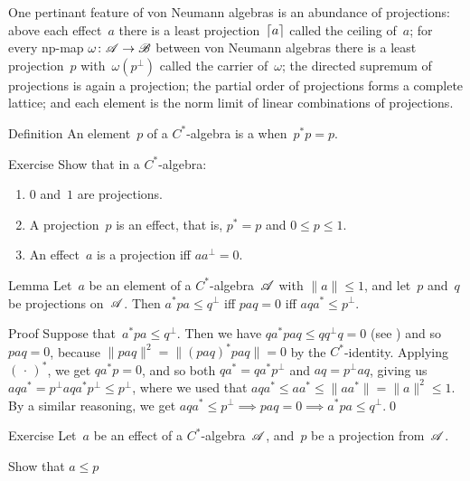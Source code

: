 \documentclass[a]{subfiles}
\begin{document}
\begin{parsec}%
\begin{point}%
One pertinant feature
of von Neumann algebras
is an abundance of projections:
above each effect~$a$ 
there is a least projection~$\left\lceil a\right\rceil$
called the ceiling of~$a$;
for every np-map $\omega\colon \mathscr{A}\to \mathscr{B}$
between von Neumann algebras
there is a least projection~$p$ with~$\omega(p^\perp)$
called the carrier of~$\omega$;
the directed supremum of projections is again a projection;
the partial order of projections forms a complete lattice;
and each element is the norm limit
of linear combinations of projections.
\end{point}
\begin{point}{Definition}%
An element~$p$ of a $C^*$-algebra
is a 
when~$p^*p=p$.
\end{point}
\begin{point}{Exercise}%
Show that in a $C^*$-algebra:
\begin{enumerate}
\item
$0$ and~$1$ are projections.
\item
A projection~$p$ is an effect,
that is, $p^*=p$
and $0\leq p\leq 1$.
\item
An effect~$a$ is a projection iff $aa^\perp=0$.
\end{enumerate}
\end{point}
\begin{point}[ad-contraposed]{Lemma}%
Let~$a$ be an element of a $C^*$-algebra~$\mathscr{A}$
with $\|a\|\leq 1$,
and let~$p$ and~$q$ be projections on~$\mathscr{A}$.
Then 
$a^* p a \leq q^\perp$
iff $paq=0$
iff  $aqa^*\leq p^\perp$.
\begin{point}{Proof}%
Suppose that~$a^*pa\leq q^\perp$.
Then we have $q a^*pa q \leq qq^\perp q = 0$
(see )
and so $paq=0$,
because $\|paq\|^2=\|(paq)^*paq\|=0$
by the $C^*$-identity.
Applying $(\,\cdot\,)^*$,
we get $qa^*p=0$, and so both $qa^* = qa^*p^\perp$
and $aq = p^\perp aq$, giving
us $aqa^* = p^\perp a q a^* p^\perp 
\leq p^\perp$,
where we used that $aqa^*\leq aa^*\leq \|aa^*\|=\|a\|^2\leq 1$.
By a similar reasoning,
we get $aqa^*\leq p^\perp \implies paq=0\implies a^*pa\leq q^\perp$.\qed
\end{point}
\end{point}
\begin{point}{Exercise}%
Let~$a$ be an effect of a $C^*$-algebra~$\mathscr{A}$,
and~$p$ be a projection from~$\mathscr{A}$.
\begin{point}%
Show that $a\leq p$

\end{point}
\end{point}
\end{parsec}
\end{document}
